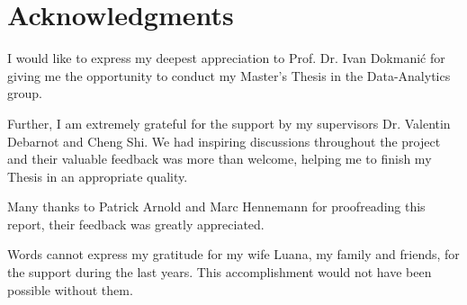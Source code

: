 \chapter{Acknowledgments}

I would like to express my deepest appreciation to Prof. Dr. Ivan Dokmanić
for giving me the opportunity to conduct my Master's Thesis in the 
Data-Analytics group.

\bigskip

Further, I am extremely grateful for the support by my supervisors
Dr. Valentin Debarnot and Cheng Shi. We had inspiring discussions
throughout the project and their valuable feedback was more than welcome,
helping me to finish my Thesis in an appropriate quality.

\bigskip
Many thanks to Patrick Arnold and Marc Hennemann for 
proofreading this report, their feedback was greatly appreciated.

\bigskip
Words cannot express my gratitude for my wife Luana, my family and friends,
for the support during the last years.
This accomplishment would not have been possible without them.